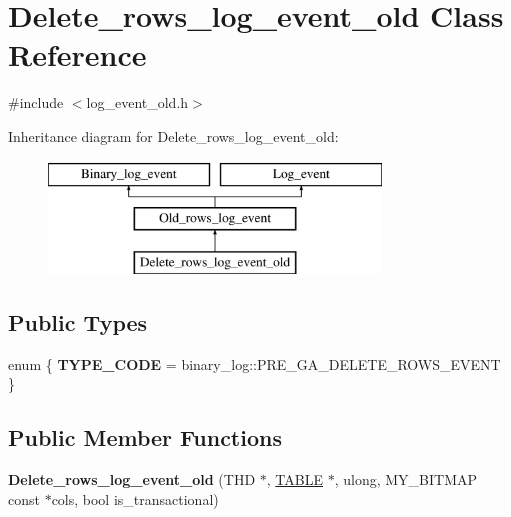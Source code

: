 \hypertarget{classDelete__rows__log__event__old}{}\section{Delete\+\_\+rows\+\_\+log\+\_\+event\+\_\+old Class Reference}
\label{classDelete__rows__log__event__old}


{\ttfamily \#include $<$log\+\_\+event\+\_\+old.\+h$>$}

Inheritance diagram for Delete\+\_\+rows\+\_\+log\+\_\+event\+\_\+old\+:\begin{figure}[H]
\begin{center}
\leavevmode
\includegraphics[height=3.000000cm]{classDelete__rows__log__event__old}
\end{center}
\end{figure}
\subsection*{Public Types}
\begin{DoxyCompactItemize}
\item 
\mbox{\label{classDelete__rows__log__event__old_afb9299d1d0b17e7dca9fbfdd3336e631}} 
enum \{ {\bfseries T\+Y\+P\+E\+\_\+\+C\+O\+DE} = binary\+\_\+log\+:\+:P\+R\+E\+\_\+\+G\+A\+\_\+\+D\+E\+L\+E\+T\+E\+\_\+\+R\+O\+W\+S\+\_\+\+E\+V\+E\+NT
 \}
\end{DoxyCompactItemize}
\subsection*{Public Member Functions}
\begin{DoxyCompactItemize}
\item 
\mbox{\label{classDelete__rows__log__event__old_a6996e013bb189cb49a1af96f903f2b29}} 
{\bfseries Delete\+\_\+rows\+\_\+log\+\_\+event\+\_\+old} (T\+HD $\ast$, \mbox{\hyperlink{structTABLE}{T\+A\+B\+LE}} $\ast$, ulong, M\+Y\+\_\+\+B\+I\+T\+M\+AP const $\ast$cols, bool is\+\_\+transactional)
\end{DoxyCompactItemize}
